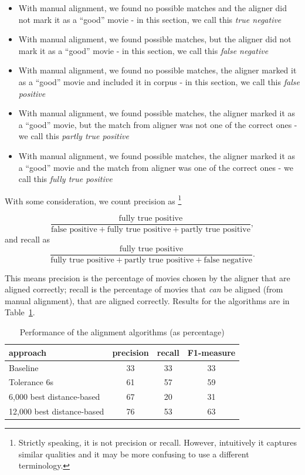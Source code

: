 \begin{itemize}
    \item With manual alignment, we found no possible matches and the aligner did not mark it as a ``good'' movie - in this section, we call this \textit{true negative}
    \item With manual alignment, we found possible matches, but the aligner did not mark it as a ``good'' movie - in this section, we call this \textit{false negative}
    \item With manual alignment, we found no possible matches, the aligner marked it as a ``good'' movie and included it in corpus - in this section, we call this \textit{false positive}
    \item With manual alignment, we found possible matches, the aligner marked it as a ``good'' movie, but the match from aligner was not one of the correct ones -  we call this \textit{partly true positive}
    \item  With manual alignment, we found possible matches, the aligner marked it as a ``good'' movie and the match from aligner was  one of the correct ones -  we call this \textit{fully true positive}
\end{itemize}

With some consideration, we count precision as \footnote{Strictly speaking, it is not precision or recall. However, intuitively it captures similar qualities and it may be more confusing to use a different terminology.}

$$\frac{\text{fully true positive}}{\text{false positive}+\text{fully true positive}+\text{partly true positive}},$$ and recall as $$\frac{\text{fully true positive}}{\text{fully true positive}+\text{partly true positive}+\text{false negative}}.$$

This means precision is the percentage of movies chosen by the aligner that are aligned correctly; recall is the percentage of movies that \emph{can} be aligned (from manual alignment), that are aligned correctly. Results for the algorithms are in Table~\ref{align_score}.

\begin{table}[h]
\begin{center}
\begin{tabular}{|l|c|c|c|} 
    \hline
    \textbf{approach} & \textbf{precision} & \textbf{recall} & \textbf{F1-measure} \\ \hline
    Baseline & 33 & 33 & 33 \\ \hline
    Tolerance 6s & 61 & 57 & 59 \\ \hline
    6,000 best distance-based & 67 & 20 & 31 \\ \hline
    12,000 best distance-based & 76 & 53 & 63 \\ \hline
\end{tabular}
\end{center}

\caption{Performance of the alignment algorithms (as percentage)}\label{align_score}
\end{table}

